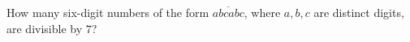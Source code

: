 How many six-digit numbers of the form $\overline{abcabc}$, where $a, b, c$ are distinct digits, are divisible by $7$?
